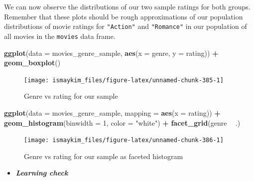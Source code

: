 \documentclass[12pt,]{krantz}
\makeatletter
\newenvironment{Shaded}{\begin{snugshade}}{\end{snugshade}}
\newcommand{\KeywordTok}[1]{\textcolor[rgb]{0.27,0.27,0.27}{\textbf{#1}}}
\newcommand{\DataTypeTok}[1]{\textcolor[rgb]{0.27,0.27,0.27}{#1}}
\newcommand{\DecValTok}[1]{\textcolor[rgb]{0.06,0.06,0.06}{#1}}
\newcommand{\StringTok}[1]{\textcolor[rgb]{0.5,0.5,0.5}{#1}}
\newcommand{\OperatorTok}[1]{\textcolor[rgb]{0.43,0.43,0.43}{\textbf{#1}}}
\newcommand{\NormalTok}[1]{#1}
\newenvironment{kframe}{%
\medskip{}
\setlength{\fboxsep}{.8em}
 \def\at@end@of@kframe{}%
 \ifinner\ifhmode%
  \def\at@end@of@kframe{\end{minipage}}%
  \begin{minipage}{\columnwidth}%
 \fi\fi%
 \def\FrameCommand##1{\hskip\@totalleftmargin \hskip-\fboxsep
 \colorbox{shadecolor}{##1}\hskip-\fboxsep
     \hskip-\linewidth \hskip-\@totalleftmargin \hskip\columnwidth}%
 \MakeFramed {\advance\hsize-\width
   \@totalleftmargin\z@ \linewidth\hsize
   \@setminipage}}%
 {\par\unskip\endMakeFramed%
 \at@end@of@kframe}
\renewenvironment{Shaded}{\begin{kframe}}{\end{kframe}}
\newenvironment{rmdblock}[1]
  {\begin{shaded*}
  \begin{itemize}
  \renewcommand{\labelitemi}{
    \raisebox{-.7\height}[0pt][0pt]{
    }
  }
  \item
  }
  {
  \end{itemize}
  \end{shaded*}
  }
\newenvironment{learncheck}
  {\begin{rmdblock}{warning}}
  {\end{rmdblock}}
\theoremstyle{definition}
\theoremstyle{definition}
\theoremstyle{definition}
\theoremstyle{remark}
\makeatother
\begin{document}
We can now observe the distributions of our two sample ratings for both
groups. Remember that these plots should be rough approximations of our
population distributions of movie ratings for \texttt{"Action"} and
\texttt{"Romance"} in our population of all movies in the
\texttt{movies} data frame.

\begin{Shaded}
\begin{Highlighting}[]
\KeywordTok{ggplot}\NormalTok{(}\DataTypeTok{data =}\NormalTok{ movies_genre_sample, }\KeywordTok{aes}\NormalTok{(}\DataTypeTok{x =}\NormalTok{ genre, }\DataTypeTok{y =}\NormalTok{ rating)) }\OperatorTok{+}
\StringTok{  }\KeywordTok{geom_boxplot}\NormalTok{()}
\end{Highlighting}
\end{Shaded}

\begin{figure}

{\centering \texttt{[image: ismaykim\_files/figure-latex/unnamed-chunk-385-1]} 

}

\caption{Genre vs rating for our sample}\label{fig:unnamed-chunk-385}
\end{figure}

\begin{Shaded}
\begin{Highlighting}[]
\KeywordTok{ggplot}\NormalTok{(}\DataTypeTok{data =}\NormalTok{ movies_genre_sample, }\DataTypeTok{mapping =} \KeywordTok{aes}\NormalTok{(}\DataTypeTok{x =}\NormalTok{ rating)) }\OperatorTok{+}
\StringTok{  }\KeywordTok{geom_histogram}\NormalTok{(}\DataTypeTok{binwidth =} \DecValTok{1}\NormalTok{, }\DataTypeTok{color =} \StringTok{"white"}\NormalTok{) }\OperatorTok{+}
\StringTok{  }\KeywordTok{facet_grid}\NormalTok{(genre }\OperatorTok{~}\StringTok{ }\NormalTok{.)}
\end{Highlighting}
\end{Shaded}

\begin{figure}

{\centering \texttt{[image: ismaykim\_files/figure-latex/unnamed-chunk-386-1]} 

}

\caption{Genre vs rating for our sample as faceted histogram}\label{fig:unnamed-chunk-386}
\end{figure}

\begin{learncheck}
\textbf{\emph{Learning check}}
\end{learncheck}
\end{document}
